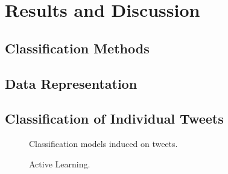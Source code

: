  
\section{Results and Discussion}

\subsection{Classification Methods }

\subsection{Data Representation}

\subsection{Classification of Individual Tweets}
\begin{figure}[t]
	\centering
		\centerline{
		}
		\vskip -0.15in
		\caption{Classification models induced on tweets.}
		\label{fig:user}
	\vskip -0.1in
\end{figure}

\begin{figure}[t]
	\centering
		
		
		\vskip -0.15in
		\caption{Active Learning.}
		\label{fig:user}
	\vskip -0.1in
\end{figure}


